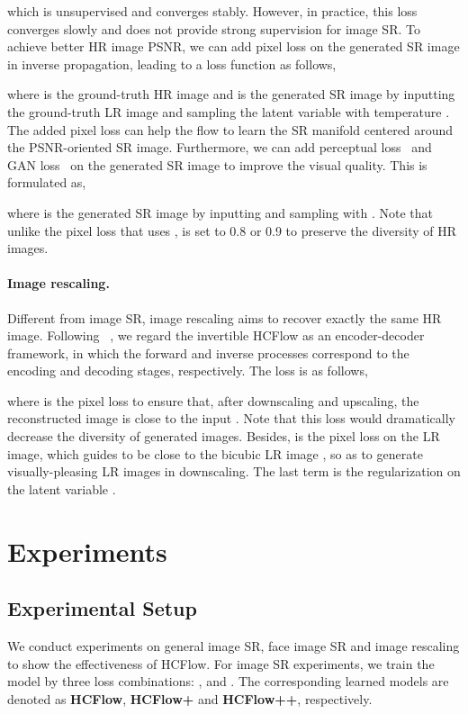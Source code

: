 \documentclass[10pt,twocolumn,letterpaper]{article}
\begin{document}
which is unsupervised and converges stably. However, in practice, this loss converges slowly and does not provide strong supervision for image SR. To achieve better HR image PSNR, we can add  pixel loss on the generated SR image in inverse propagation, leading to a loss function as follows,

where  is the ground-truth HR image and  is the generated SR image by inputting the ground-truth LR image  and sampling the latent variable  with temperature . The added pixel loss can help the flow to learn the SR manifold centered around the PSNR-oriented SR image. Furthermore, we can add perceptual loss~\cite{johnson2016perceptual} and GAN loss~\cite{goodfellow2014generative} on the generated SR image to improve the visual quality. This is formulated as,

where  is the generated SR image by inputting  and sampling  with . Note that unlike the pixel loss that uses ,  is set to 0.8 or 0.9 to preserve the diversity of HR images.

\vspace{-0.4cm}
\paragraph{Image rescaling.}
Different from image SR, image rescaling aims to recover exactly the same HR image. Following ~\cite{xiao2020IRN}, we regard the invertible HCFlow as an encoder-decoder framework, in which the forward and inverse processes correspond to the encoding and decoding stages, respectively. The loss is as follows,

where  is the  pixel loss to ensure that, after downscaling and upscaling, the reconstructed image  is close to the input . Note that this loss would dramatically decrease the diversity of generated images. Besides,  is the  pixel loss on the LR image, which guides  to be close to the bicubic LR image , so as to generate visually-pleasing LR images in downscaling. The last term  is the  regularization on the latent variable .



\section{Experiments}
\subsection{Experimental Setup}
We conduct experiments on general image SR, face image SR and image rescaling to show the effectiveness of HCFlow. For image SR experiments, we train the model by three loss combinations: ,  and . The corresponding learned models are denoted as \textbf{HCFlow}, \textbf{HCFlow+} and \textbf{HCFlow++}, respectively.
\end{document}
